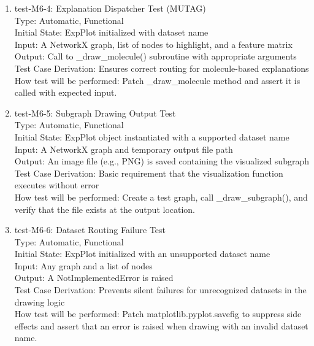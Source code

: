 \documentclass[12pt, titlepage]{article}
\begin{document}
\begin{enumerate}
\item{test-M6-4: Explanation Dispatcher Test (MUTAG)\\}
Type: Automatic, Functional \\
Initial State: ExpPlot initialized with dataset name \\
Input: A NetworkX graph, list of nodes to highlight, and a feature matrix \\
Output: Call to \_draw\_molecule() subroutine with appropriate arguments \\
Test Case Derivation: Ensures correct routing for molecule-based explanations \\
How test will be performed: Patch \_draw\_molecule method and assert it is called with expected input.

\item{test-M6-5: Subgraph Drawing Output Test\\}
Type: Automatic, Functional \\
Initial State: ExpPlot object instantiated with a supported dataset name \\
Input: A NetworkX graph and temporary output file path \\
Output: An image file (e.g., PNG) is saved containing the visualized subgraph \\
Test Case Derivation: Basic requirement that the visualization function executes without error \\
How test will be performed: Create a test graph, call \_draw\_subgraph(), and verify that the file exists at the output location.

\item{test-M6-6: Dataset Routing Failure Test\\}
Type: Automatic, Functional \\
Initial State: ExpPlot initialized with an unsupported dataset name \\
Input: Any graph and a list of nodes \\
Output: A NotImplementedError is raised \\
Test Case Derivation: Prevents silent failures for unrecognized datasets in the drawing logic \\
How test will be performed: Patch matplotlib.pyplot.savefig to suppress side effects and assert that an error is raised when drawing with an invalid dataset name.

\end{enumerate}
\end{document}
